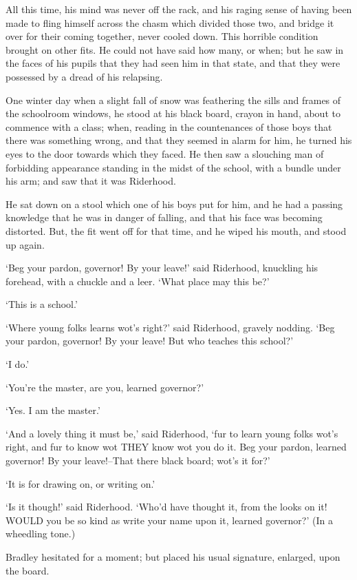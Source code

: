 All this time, his mind was never off the rack, and his raging sense of
having been made to fling himself across the chasm which divided those
two, and bridge it over for their coming together, never cooled down.
This horrible condition brought on other fits. He could not have said
how many, or when; but he saw in the faces of his pupils that they had
seen him in that state, and that they were possessed by a dread of his
relapsing.

One winter day when a slight fall of snow was feathering the sills and
frames of the schoolroom windows, he stood at his black board, crayon in
hand, about to commence with a class; when, reading in the countenances
of those boys that there was something wrong, and that they seemed in
alarm for him, he turned his eyes to the door towards which they faced.
He then saw a slouching man of forbidding appearance standing in the
midst of the school, with a bundle under his arm; and saw that it was
Riderhood.

He sat down on a stool which one of his boys put for him, and he had a
passing knowledge that he was in danger of falling, and that his face
was becoming distorted. But, the fit went off for that time, and he
wiped his mouth, and stood up again.

‘Beg your pardon, governor! By your leave!’ said Riderhood, knuckling
his forehead, with a chuckle and a leer. ‘What place may this be?’

‘This is a school.’

‘Where young folks learns wot’s right?’ said Riderhood, gravely nodding.
‘Beg your pardon, governor! By your leave! But who teaches this school?’

‘I do.’

‘You’re the master, are you, learned governor?’

‘Yes. I am the master.’

‘And a lovely thing it must be,’ said Riderhood, ‘fur to learn young
folks wot’s right, and fur to know wot THEY know wot you do it. Beg your
pardon, learned governor! By your leave!--That there black board; wot’s
it for?’

‘It is for drawing on, or writing on.’

‘Is it though!’ said Riderhood. ‘Who’d have thought it, from the
looks on it! WOULD you be so kind as write your name upon it, learned
governor?’ (In a wheedling tone.)

Bradley hesitated for a moment; but placed his usual signature,
enlarged, upon the board.

